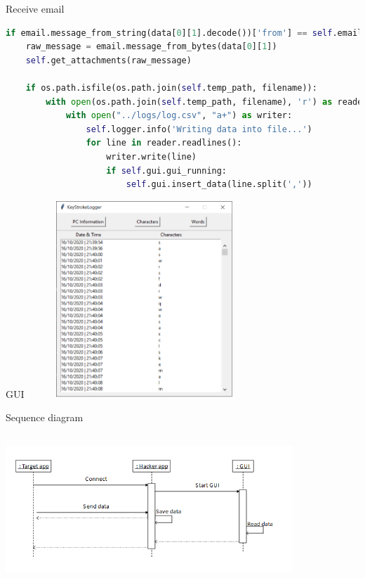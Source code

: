 \documentclass{beamer}
\begin{document}
\begin{frame}[fragile]{Receive email}
\begin{lstlisting}[language=Python]
if email.message_from_string(data[0][1].decode())['from'] == self.email_address:
	raw_message = email.message_from_bytes(data[0][1])
	self.get_attachments(raw_message)
	
	if os.path.isfile(os.path.join(self.temp_path, filename)):
		with open(os.path.join(self.temp_path, filename), 'r') as reader:
			with open("../logs/log.csv", "a+") as writer:
				self.logger.info('Writing data into file...')
				for line in reader.readlines():
					writer.write(line)
					if self.gui.gui_running:
						self.gui.insert_data(line.split(','))
\end{lstlisting}
\end{frame}

\begin{frame}{GUI}
\centering
\includegraphics[width=250pt, height=210pt]{../images/GUI final}
\end{frame}

\begin{frame}{Sequence diagram}
\includegraphics[width=307pt, height=180pt]{../images/startup diagram}
\end{frame}
\end{document}
